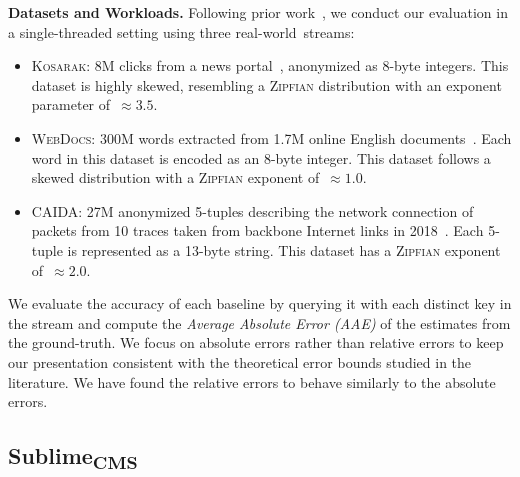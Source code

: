 \documentclass[sigconf]{acmart}
\newcommand{\sketch}{Sublime}
\newcommand{\sketchcms}{\sketch\textsubscript{CMS}\xspace}
\begin{document}
\textbf{Datasets and Workloads.}
Following prior work~\cite{CountMeanMin,SALSA,BitSense,PyramidSketch,StingySketch,AdaptiveCounterSplicing,CounterTree,TreeSensing,TailoredSketch,AugmentedSketch,HeavyGuardian,HeavyKeeper,WavingSketch,ElasticSketch,MVSketch,SpaceSaving,BatchUpdateMisraGries,BitMatcher,JigsawSketch,MicroscopeSketch,PSketch,TightSketch}, we conduct our evaluation in a single-threaded setting using three real-world~streams:
\begin{itemize}
    \item \textsc{Kosarak}: 8M clicks from a news portal~\cite{Kosarak},
      anonymized as 8-byte integers. This dataset is highly skewed, resembling
      a \textsc{Zipfian} distribution with an exponent parameter of~$\approx
      3.5$.
    \item \textsc{WebDocs}: 300M words extracted from 1.7M online English
        documents~\cite{WebDocs}. Each word in this dataset is encoded as
        an 8-byte integer. This dataset follows a skewed distribution with a
        \textsc{Zipfian} exponent of~$\approx 1.0$.
    \item \textsc{CAIDA}: 27M anonymized 5-tuples describing the network
      connection of packets from 10 traces taken from backbone Internet links
      in 2018~\cite{CAIDA2018}. Each 5-tuple is represented as a 13-byte
      string. This dataset has a \textsc{Zipfian} exponent of~$\approx 2.0$.
\end{itemize}
We evaluate the accuracy of each baseline by querying it with each distinct key in the stream and compute the \emph{Average Absolute Error (AAE)} of the estimates from the ground-truth.
We focus on absolute errors rather than relative errors to keep our presentation consistent with the theoretical error bounds studied in the literature.
We have found the relative errors to behave similarly to the absolute errors.

\subsection{\sketchcms}\label{sec:evaluation_cms}
\end{document}
